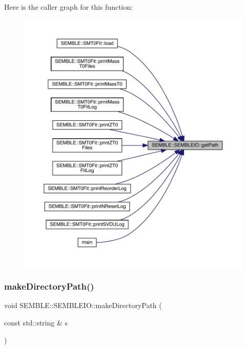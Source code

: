 Here is the caller graph for this function\+:
\nopagebreak
\begin{figure}[H]
\begin{center}
\leavevmode
\includegraphics[width=350pt]{d7/d84/namespaceSEMBLE_1_1SEMBLEIO_a33874c7b50e9151f263de780862fa2a0_icgraph}
\end{center}
\end{figure}
\mbox{\label{namespaceSEMBLE_1_1SEMBLEIO_a522b094bf70472aca4f1875006d8568d}} 
\subsubsection{\texorpdfstring{makeDirectoryPath()}{makeDirectoryPath()}}
{\footnotesize\ttfamily void S\+E\+M\+B\+L\+E\+::\+S\+E\+M\+B\+L\+E\+I\+O\+::make\+Directory\+Path (\begin{DoxyParamCaption}\item[{const std\+::string \&}]{s }\end{DoxyParamCaption})}

